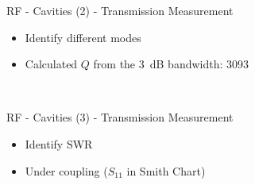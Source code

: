 \documentclass{beamer}
\begin{document}
\begin{frame}[t,fragile]{RF - Cavities (2) - Transmission Measurement}
\begin{itemize}
\item Identify different modes 
\item Calculated $Q$ from the \SI{3}{\dB} bandwidth: \num{3093}
\begin{figure}
  \centering\setcounter{subfigure}{0}
  \quad
  \\
\end{figure}
\end{itemize}
\end{frame}

\begin{frame}[t,fragile]{RF - Cavities (3) - Transmission Measurement}
\begin{itemize}
\item Identify SWR
\item Under coupling ($S_{11}$ in Smith Chart)
\begin{figure}
  \centering\setcounter{subfigure}{0}
  \quad
  \\
\end{figure}
\end{itemize}
\end{frame}
\end{document}
